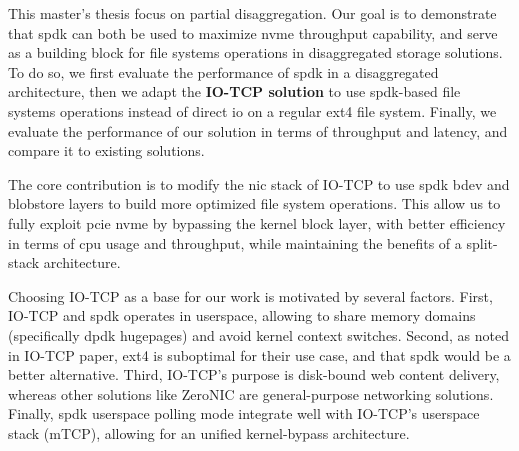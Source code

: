 This master's thesis focus on partial disaggregation. Our goal is to demonstrate that \acrshort{spdk} can both be used to maximize \acrshort{nvme} throughput capability, and serve as a building block for file systems operations in disaggregated storage solutions. To do so, we first evaluate the performance of \acrshort{spdk} in a disaggregated architecture, then we adapt the \textbf{IO-TCP solution} to use \acrshort{spdk}-based file systems operations instead of direct \acrshort{io} on a regular ext4 file system. Finally, we evaluate the performance of our solution in terms of throughput and latency, and compare it to existing solutions.

The core contribution is to modify the \acrshort{nic} stack of IO-TCP to use \acrshort{spdk} \acrlong{bdev} and blobstore layers to build more optimized file system operations. This allow us to fully exploit \acrshort{pcie} \acrshort{nvme} by bypassing the kernel block layer, with better efficiency in terms of \acrshort{cpu} usage and throughput, while maintaining the benefits of a split-stack architecture.

Choosing IO-TCP as a base for our work is motivated by several factors. First, IO-TCP and \acrshort{spdk} operates in userspace, allowing to share memory domains (specifically \acrshort{dpdk} hugepages) and avoid kernel context switches. Second, as noted in IO-TCP paper, ext4 is suboptimal for their use case, and that \acrshort{spdk} would be a better alternative. Third, IO-TCP's purpose is disk-bound web content delivery, whereas other solutions like ZeroNIC are general-purpose networking solutions. Finally, \acrshort{spdk} userspace polling mode integrate well with IO-TCP's userspace stack (mTCP), allowing for an unified kernel-bypass architecture. 
